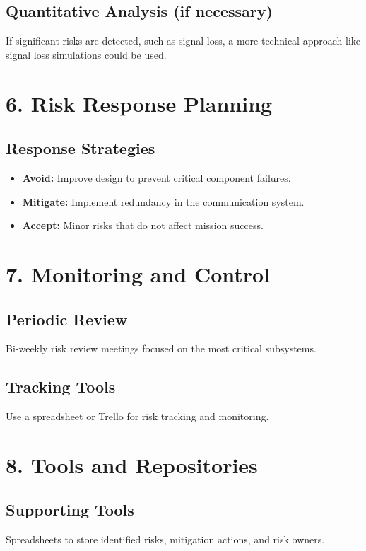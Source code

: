 \documentclass{article}
\begin{document}
\subsection*{Quantitative Analysis (if necessary)}
If significant risks are detected, such as signal loss, a more technical approach like signal loss simulations could be used.

\section*{6. Risk Response Planning}

\subsection*{Response Strategies}
\begin{itemize}
    \item \textbf{Avoid:} Improve design to prevent critical component failures.
    \item \textbf{Mitigate:} Implement redundancy in the communication system.
    \item \textbf{Accept:} Minor risks that do not affect mission success.
\end{itemize}

\section*{7. Monitoring and Control}

\subsection*{Periodic Review}
Bi-weekly risk review meetings focused on the most critical subsystems.

\subsection*{Tracking Tools}
Use a spreadsheet or Trello for risk tracking and monitoring.

\section*{8. Tools and Repositories}

\subsection*{Supporting Tools}
Spreadsheets to store identified risks, mitigation actions, and risk owners.
\end{document}
